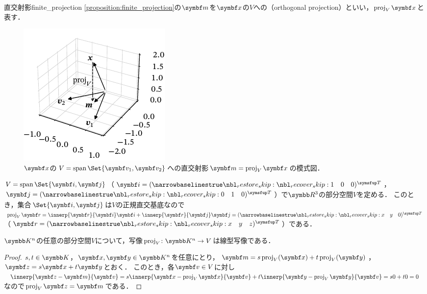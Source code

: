 \documentclass[../../main]{subfiles}
\begin{document}
\begin{definition}{直交射影}{finite_projection}
  \cref{proposition:finite_projection}の\(\vect{m}\)を\(\vect{x}\)の\(V\)への（orthogonal projection）といい，\(\proj_V\vect{x}\)と表す．
\end{definition}

\begin{figure}[htbp]
  \centering
  \includegraphics{figures/proj3d.pdf}
  \caption{\(\vect{x}\)の\(V=\spannedby\Set{\vect{v}_1,\vect{v}_2}\)への直交射影\(\vect{m}=\proj_V\vect{x}\)の模式図．}
\end{figure}

\begin{example}
  \(V=\spannedby\Set{\vect{i},\vect{j}}\)（\(\vect{i}=\trps{\rowvect{1 & 0 & 0}}\)，\(\vect{j}=\trps{\rowvect{0 & 1 & 0}}\)）で\(\numset{R}^3\)の部分空間\(V\)を定める．
  このとき，集合\(\Set{\vect{i},\vect{j}}\)は\(V\)の正規直交基底なので\(\proj_V\vect{r}=\innerp{\vect{r}}{\vect{i}}\vect{i}+\innerp{\vect{r}}{\vect{j}}\vect{j}=\trps{\rowvect{x & y & 0}}\)（\(\vect{r}=\trps{\rowvect{x & y & z}}\)）である．
\end{example}

\begin{proposition}{}{}
  \(\numset{K}^n\)の任意の部分空間\(V\)について，写像\(\proj_V\colon\numset{K}^n\to V\)は線型写像である．
\end{proposition}

\begin{proof}
  \(s,t\in\numset{K}\)，\(\vect{x},\vect{y}\in\numset{K}^n\)を任意にとり，\(\vect{m}=s\proj_V(\vect{x})+t\proj_V(\vect{y})\)，\(\vect{z}=s\vect{x}+t\vect{y}\)とおく．
  このとき，各\(\vect{v}\in V\)に対し\(\innerp{\vect{z}-\vect{m}}{\vect{v}}=s\innerp{\vect{x}-\proj_V\vect{x}}{\vect{v}}+t\innerp{\vect{y}-\proj_V\vect{y}}{\vect{v}}=s0+t0=0\)なので\(\proj_V\vect{z}=\vect{m}\)である．
\end{proof}
\end{document}
